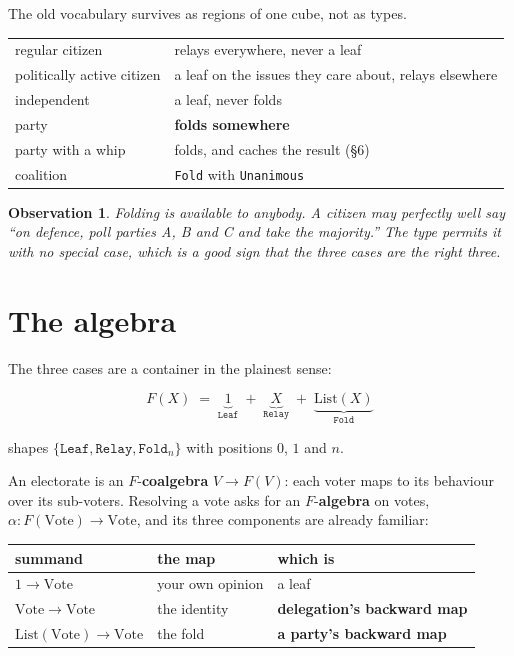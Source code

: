 \documentclass[11pt,a4paper]{article}
\newtheorem*{obs}{Observation}
\begin{document}
The old vocabulary survives as regions of one cube, not as types.

\begin{center}
\begin{tabular}{@{}lp{8.6cm}@{}}
\toprule
regular citizen & relays everywhere, never a leaf \\
politically active citizen & a leaf on the issues they care about, relays elsewhere \\
independent & a leaf, never folds \\
party & \textbf{folds somewhere} \\
party with a whip & folds, and caches the result (\S6) \\
coalition & \texttt{Fold} with \texttt{Unanimous} \\
\bottomrule
\end{tabular}
\end{center}

\begin{obs}
Folding is available to \emph{anybody}. A citizen may perfectly well say ``on
defence, poll parties A, B and C and take the majority.'' The type permits it
with no special case, which is a good sign that the three cases are the right
three.
\end{obs}

\section{The algebra}

The three cases are a container in the plainest sense:

\[
  F(X) \;=\; \underbrace{1}_{\texttt{Leaf}} \;+\; \underbrace{X}_{\texttt{Relay}}
  \;+\; \underbrace{\mathrm{List}(X)}_{\texttt{Fold}}
\]

shapes $\{\texttt{Leaf}, \texttt{Relay}, \texttt{Fold}_n\}$ with positions
$0$, $1$ and $n$.

An electorate is an $F$-\textbf{coalgebra} $V \to F(V)$: each voter maps to its
behaviour over its sub-voters. Resolving a vote asks for an $F$-\textbf{algebra}
on votes, $\alpha : F(\mathrm{Vote}) \to \mathrm{Vote}$, and its three components
are already familiar:

\begin{center}
\begin{tabular}{@{}lll@{}}
\toprule
summand & the map & which is \\
\midrule
$1 \to \mathrm{Vote}$ & your own opinion & a leaf \\
$\mathrm{Vote} \to \mathrm{Vote}$ & the identity & \textbf{delegation's backward map} \\
$\mathrm{List}(\mathrm{Vote}) \to \mathrm{Vote}$ & the fold & \textbf{a party's backward map} \\
\bottomrule
\end{tabular}
\end{center}
\end{document}
